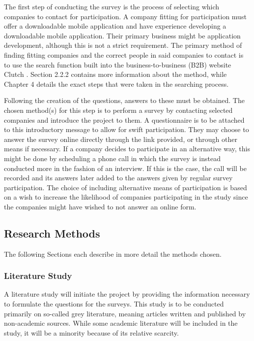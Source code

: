 \documentclass[a4paper,12pt]{article}
\begin{document}
The first step of conducting the survey is the process of selecting which companies to contact for participation. A company fitting for participation must offer a downloadable mobile application and have experience developing a downloadable mobile application. Their primary business might be application development, although this is not a strict requirement. The primary method of finding fitting companies and the correct people in said companies to contact is to use the search function built into the business-to-business (B2B) website Clutch \cite{clutch}. Section 2.2.2 contains more information about the method, while Chapter 4 details the exact steps that were taken in the searching process.

Following the creation of the questions, answers to these must be obtained. The chosen method(s) for this step is to perform a survey by contacting selected companies and introduce the project to them. A questionnaire is to be attached to this introductory message to allow for swift participation. They may choose to answer the survey online directly through the link provided, or through other means if necessary. If a company decides to participate in an alternative way, this might be done by scheduling a phone call in which the survey is instead conducted more in the fashion of an interview. If this is the case, the call will be recorded and its answers later added to the answers given by regular survey participation. The choice of including alternative means of participation is based on a wish to increase the likelihood of companies participating in the study since the companies might have wished to not answer an online form.


\subsection{Research Methods}
The following Sections each describe in more detail the methods chosen.

\subsubsection{Literature Study}
A literature study will initiate the project by providing the information necessary to formulate the questions for the surveys. This study is to be conducted primarily on so-called grey literature, meaning articles written and published by non-academic sources. While some academic literature will be included in the study, it will be a minority because of its relative scarcity. 
\end{document}
